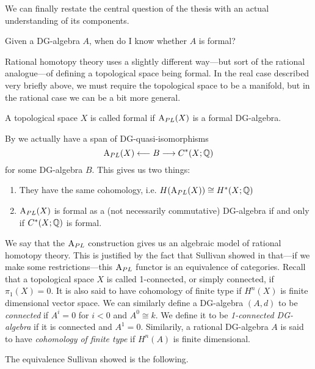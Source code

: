 We can finally restate the central question of the thesis with an actual understanding of its components.
\begin{central}
Given a DG-algebra $A$, when do I know whether $A$ is formal? 
\end{central}

Rational homotopy theory uses a slightly different way---but sort of the rational analogue---of defining a topological space being formal. In the real case described very briefly above, we must require the topological space to be a manifold, but in the rational case we can be a bit more general. 


\begin{definition}
\label{def:formal_space}
A topological space $X$ is called formal if $\text{A}_{PL}(X)$ is a formal DG-algebra. 
\end{definition}

By \cite[Corollary 10.10]{FHT} we actually have a span of DG-quasi-isomorphisms 
\begin{equation*}
    \text{A}_{PL}(X)\longleftarrow B \longrightarrow C^*(X;\mathbb{Q})
\end{equation*}
for some DG-algebra $B$. This gives us two things:
\begin{enumerate}
    \item They have the same cohomology, i.e. $H(\text{A}_{PL}(X)) \cong H^*(X;\mathbb{Q})$
    \item $\text{A}_{PL}(X)$ is formal as a (not necessarily commutative) DG-algebra if and only if $C^*(X;\mathbb{Q})$ is formal. 
\end{enumerate}

We say that the $\text{A}_{PL}$ construction gives us an algebraic model of rational homotopy theory. This is justified by the fact that Sullivan showed in \cite{Sullivan} that---if we make some restrictions---this $\text{A}_{PL}$ functor is an equivalence of categories. Recall that a topological space $X$ is called 1-connected, or simply connected, if $\pi_1(X)=0$. It is also said to have cohomology of finite type if $H^n(X)$ is finite dimensional vector space. We can similarly define a DG-algebra $(A, d)$ to be \emph{connected} if $A^i = 0$ for $i< 0$ and $A^0\cong k$. We define it to be \emph{1-connected DG-algebra} if it is connected and $A^1=0$. Similarily, a rational DG-algebra $A$ is said to have \emph{cohomology of finite type} if $H^n(A)$ is finite dimensional. 

The equivalence Sullivan showed is the following.

